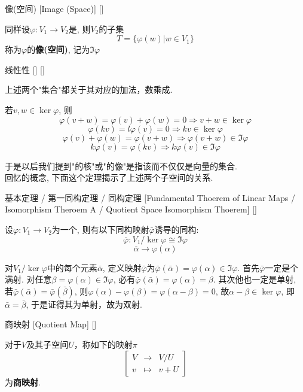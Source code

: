 \documentclass[UTF8]{ctexart}
\begin{document}
        \begin{dfn}
			[]
			{像(空间)}
			[Image (Space)]
			[]

            同样设$\varphi:V_1\to V_2$是, 则$V_2$的子集
            \[T=\{\varphi (w)|w\in V_1\}\]
            称为$\varphi$的\textbf{像(空间)}, 记为$\Im\varphi$
        \end{dfn}
        \begin{ppt}
			[]
			{线性性}
			[]
			[]

            上述两个"集合"都关于其对应的加法，数乘成.
        \end{ppt}
        \begin{prf}
            若$v,w\in \ker\varphi$, 则
            \[\varphi(v+w)=\varphi(v)+\varphi(w)=0\Longrightarrow v+w\in\ker\varphi\]
            \[\varphi(kv)=l\varphi(v)=0\Longrightarrow kv\in\ker\varphi\]
            \[\varphi(v)+\varphi(w)=\varphi(v+w)\Longrightarrow\varphi(v+w)\in\Im\varphi\]
            \[k\varphi(v)=\varphi(kv)\Longrightarrow k\varphi(v)\in\Im\varphi\]
        \end{prf}
        于是以后我们提到" 的核"或" 的像"是指该 而不仅仅是向量的集合.\\
        回忆 的概念, 下面这个定理揭示了上述两个子空间的关系.
        
        \begin{thm}
			[]
			{ 基本定理 / 第一同构定理 / \商空间 同构定理}
			[Fundamental Thoerem of Linear Maps / Isomorphism Theroem A / Quotient Space Isomorphism Thoerem]
			[]

			设$\varphi:V_1\to V_2$为一个, 则有以下同构映射$\bar{\varphi}$诱导的同构:
			\[\overline{\varphi}:V_1/\ker\varphi\cong\Im\varphi\]
			\[\overline{\alpha}\to\varphi(\alpha)\]
			\end{thm}
			\begin{prf}
			对$V_1/\ker\varphi$中的每个元素$\bar{\alpha}$, 定义映射$\bar{\varphi}$为$\bar{\varphi}(\bar{\alpha})=\varphi(\alpha)\in\Im\varphi$. 
			首先$\bar{\varphi}$一定是个满射. 对任意$\beta=\varphi(\alpha)\in\Im\varphi$, 必有$\bar{\varphi}(\bar{\alpha})=\varphi(\alpha)=\beta$. 其次他也一定是单射, 若$\bar{\varphi}(\bar{\alpha})=\bar{\varphi}(\bar{\beta})$, 则$\varphi(\alpha)-\varphi(\beta)=\varphi(\alpha-\beta)=0$, 故$\alpha-\beta\in\ker\varphi$, 即$\bar{\alpha}=\bar{\beta}$, 于是证得其为单射，故为双射.
        \end{prf}

		\begin{dfn}
			[]
			{商映射}
			[Quotient Map]
			[]

			对于$V$及其子空间$U$，称如下的映射$\pi$
			\[\begin{bmatrix}
				V&\to&V/U\\
				v&\mapsto&v+U 
			\end{bmatrix}\]
			为\textbf{商映射}.
		\end{dfn}
\end{document}
